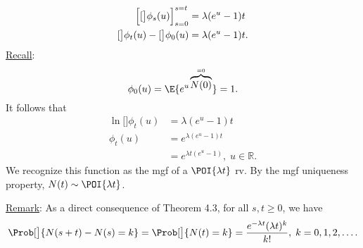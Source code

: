 \begin{Result}
\begin{align*}
        \Bigl[\ln[\big]{\phi_s(u)}\Bigr]_{s=0}^{s=t}               & =\lambda (e^u-1)t                                                                               \\
        \ln[\big]{\phi_t(u)}-\ln[\big]{\phi_0(u)}                  & =\lambda (e^u-1)t.
    \end{align*}
    \underline{Recall}:
    \[ \phi_0(u)=\E{e^{u \overbrace{N(0)}^{=0}}}=1. \]
    It follows that
    \begin{align*}
        \ln[\big]{\phi_t(u)} & =\lambda(e^u-1)t                         \\
        \phi_t(u)            & =e^{\lambda(e^u-1)t}                     \\
                             & =e^{\lambda t(e^u-1)},\; u\in\mathbb{R}.
    \end{align*}
    We recognize this function as the mgf of a $ \POI{\lambda t} $ rv.
    By the mgf uniqueness property, $ N(t)\sim \POI{\lambda t} $.
\end{Result}
\underline{Remark}: As a direct consequence of Theorem 4.3, for all $ s,t\ge 0 $, we have
\[ \Prob[\big]{N(s+t)-N(s)=k}=\Prob[\big]{N(t)=k}=\frac{e^{-\lambda t}(\lambda t)^k}{k!},\; k=0,1,2,\ldots. \]
